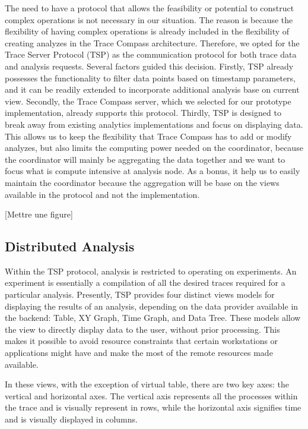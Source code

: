 The need to have a protocol that allows the feasibility or potential to construct complex operations is not necessary in our situation. The reason is because the flexibility of having complex operations is already included in the flexibility of creating analyzes in the Trace Compass architecture. Therefore, we opted for the Trace Server Protocol (TSP) as the communication protocol for both trace data and analysis requests. Several factors guided this decision. Firstly, TSP already possesses the functionality to filter data points based on timestamp parameters, and it can be readily extended to incorporate additional analysis base on current view. Secondly, the Trace Compass server, which we selected for our prototype implementation, already supports this protocol. Thirdly, TSP is designed to break away from existing analytics implementations and focus on displaying data. This allows us to keep the flexibility that Trace Compass has to add or modify analyzes, but also limits the computing power needed on the coordinator, because the coordinator will mainly be aggregating the data together and we want to focus what is compute intensive at analysis node. As a bonus, it help us to easily maintain the coordinator because the aggregation will be base on the views available in the protocol and not the implementation.

[Mettre une figure]

\subsection{Distributed Analysis}

Within the TSP protocol, analysis is restricted to operating on experiments. An experiment is essentially a compilation of all the desired traces required for a particular analysis. Presently, TSP provides four distinct views models for displaying the results of an analysis, depending on the data provider available in the backend: Table, XY Graph, Time Graph, and Data Tree. These models allow the view to directly display data to the user, without prior processing. This makes it possible to avoid resource constraints that certain workstations or applications might have and make the most of the remote resources made available.

In these views, with the exception of virtual table, there are two key axes: the vertical and horizontal axes. The vertical axis represents all the processes within the trace and is visually represent in rows, while the horizontal axis signifies time and is visually displayed in columns.

